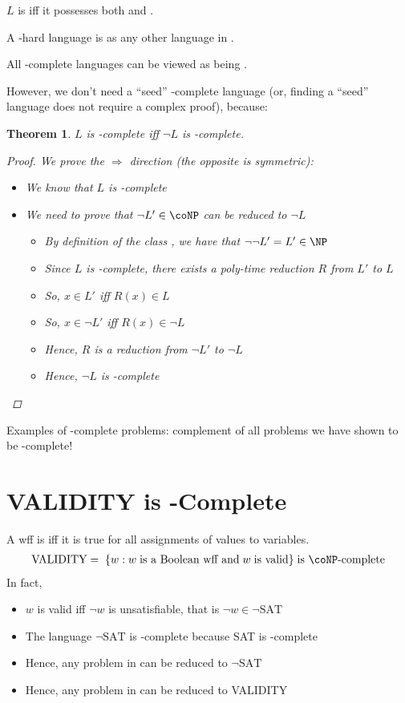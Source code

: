 \documentclass[a4paper]{report}
\newtheorem{theo}{Theorem}
\theoremstyle{definition}
\begin{document}
$L$ is  iff it possesses both  and .

A \coNP-hard language is  as any other language in \coNP.

All \coNP-complete languages can be viewed as being .

However, we don't need a ``seed'' \coNP-complete language (or, finding a ``seed'' language does not require a complex proof), because:
%
\begin{theo}
$L$ is \NP-complete iff $\neg L$ is \coNP-complete.
\begin{proof}
We prove the $\Rightarrow$ direction (the opposite is symmetric):
\begin{itemize}
\item We know that $L$ is \NP-complete
\item We need to prove that  $\neg L' \in \coNP$ can be reduced to $\neg L$
\begin{itemize}
\item By definition of the class \coNP, we have that $\neg \neg L' = L' \in \NP$
\item Since $L$ is \NP-complete, there exists a poly-time reduction $R$ from $L'$ to $L$
\item So, $x \in L'$ iff $R(x) \in L$
\item So, $x \in \neg L'$ iff $R(x) \in \neg L$
\item Hence, $R$ is a reduction from $\neg L'$ to $\neg L$
\item Hence, $\neg L$ is \coNP-complete
\end{itemize}
\end{itemize}
\end{proof}
\end{theo}

Examples of \coNP-complete problems: complement of all problems we have shown to be \NP-complete!

\section{VALIDITY is \coNP-Complete}
A wff is  iff it is true for all assignments of values to variables.
%
\begin{align*}
\text{VALIDITY} = \; \{ w : w \;\text{is a Boolean wff and} \; w \;\text{is valid} \} \; \text{is \coNP-complete}
\end{align*}
%
In fact,
\begin{itemize}
\item $w$ is valid iff $\neg w$ is unsatisfiable, that is $\neg w \in \neg\text{SAT}$
\item The language $\neg\text{SAT}$ is \coNP-complete because SAT is \NP-complete
\item Hence, any problem in \coNP{} can be reduced to $\neg\text{SAT}$
\item Hence, any problem in \coNP{} can be reduced to VALIDITY
\end{itemize}
\end{document}
